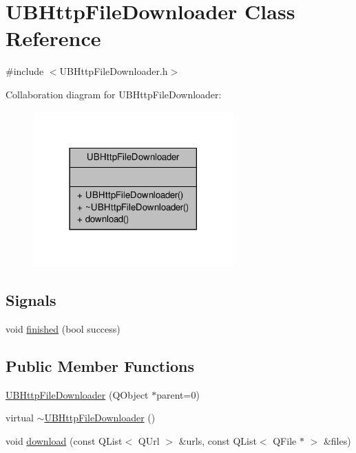\hypertarget{class_u_b_http_file_downloader}{\section{U\-B\-Http\-File\-Downloader Class Reference}
\label{d8/d64/class_u_b_http_file_downloader}
}


{\ttfamily \#include $<$U\-B\-Http\-File\-Downloader.\-h$>$}



Collaboration diagram for U\-B\-Http\-File\-Downloader\-:
\nopagebreak
\begin{figure}[H]
\begin{center}
\leavevmode
\includegraphics[width=218pt]{dd/d7f/class_u_b_http_file_downloader__coll__graph}
\end{center}
\end{figure}
\subsection*{Signals}
\begin{DoxyCompactItemize}
\item 
void \hyperlink{class_u_b_http_file_downloader_a69402d8027c5a439e6565e8ca143e3a4}{finished} (bool success)
\end{DoxyCompactItemize}
\subsection*{Public Member Functions}
\begin{DoxyCompactItemize}
\item 
\hyperlink{class_u_b_http_file_downloader_aba49d51f4c5a5adce6db82b3399e1439}{U\-B\-Http\-File\-Downloader} (Q\-Object $\ast$parent=0)
\item 
virtual \hyperlink{class_u_b_http_file_downloader_a46282f8a294404314c47c5c226f1e782}{$\sim$\-U\-B\-Http\-File\-Downloader} ()
\item 
void \hyperlink{class_u_b_http_file_downloader_a36b270df4a29afd0b819ee83912297b1}{download} (const Q\-List$<$ Q\-Url $>$ \&urls, const Q\-List$<$ Q\-File $\ast$ $>$ \&files)
\end{DoxyCompactItemize}


